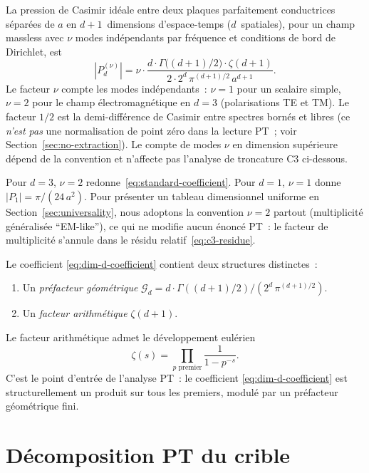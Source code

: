 \documentclass[11pt,a4paper]{article}
\begin{document}
La pression de Casimir idéale entre deux plaques parfaitement conductrices séparées de $a$ en
$d+1$~dimensions d'espace-temps ($d$~spatiales), pour un champ massless avec $\nu$ modes
indépendants par fréquence et conditions de bord de Dirichlet, est~\cite{Mostepanenko2009,Klimchitskaya2009}
\begin{equation}
|P_{d}^{(\nu)}| = \nu \cdot \frac{d \cdot \Gamma\bigl((d+1)/2\bigr) \cdot \zeta(d+1)}{2 \cdot 2^{d}\,\pi^{(d+1)/2}\,a^{d+1}}.
\label{eq:dim-d-coefficient}
\end{equation}
Le facteur $\nu$ compte les modes indépendants~: $\nu = 1$ pour un scalaire simple, $\nu = 2$ pour
le champ électromagnétique en $d = 3$ (polarisations TE et TM). Le facteur $1/2$ est la
demi-différence de Casimir entre spectres bornés et libres (ce \emph{n'est pas} une normalisation
de point zéro dans la lecture PT~; voir Section~\ref{sec:no-extraction}). Le compte de modes $\nu$
en dimension supérieure dépend de la convention et n'affecte pas l'analyse de troncature C3
ci-dessous.

Pour $d = 3$, $\nu = 2$ redonne~\eqref{eq:standard-coefficient}. Pour $d = 1$, $\nu = 1$ donne
$|P_1| = \pi/(24\,a^2)$. Pour présenter un tableau dimensionnel uniforme en
Section~\ref{sec:universality}, nous adoptons la convention $\nu = 2$ partout (multiplicité
généralisée ``EM-like''), ce qui ne modifie aucun énoncé PT~: le facteur de multiplicité s'annule
dans le résidu relatif~\eqref{eq:c3-residue}.

Le coefficient \eqref{eq:dim-d-coefficient} contient deux structures distinctes~:
\begin{enumerate}
  \item Un \emph{préfacteur géométrique}
  $\mathcal{G}_{d} = d \cdot \Gamma((d+1)/2) / (2^{d}\,\pi^{(d+1)/2})$.
  \item Un \emph{facteur arithmétique} $\zeta(d+1)$.
\end{enumerate}

Le facteur arithmétique admet le développement eulérien
\begin{equation}
\zeta(s) = \prod_{p \text{ premier}} \frac{1}{1 - p^{-s}}.
\label{eq:euler-product}
\end{equation}
C'est le point d'entrée de l'analyse PT~: le coefficient \eqref{eq:dim-d-coefficient} est
structurellement un produit sur tous les premiers, modulé par un préfacteur géométrique fini.

\section{Décomposition PT du crible}
\label{sec:pt-decomposition}
\end{document}
